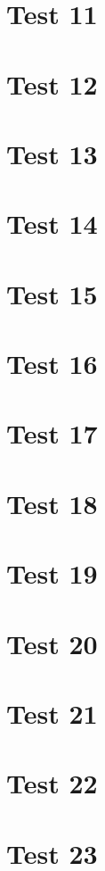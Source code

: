 \documentclass[a4paper]{article}
\begin{document}
\section{Test 11}
\label{sec:test-11}
\section{Test 12}
\label{sec:test-12}
\section{Test 13}
\label{sec:test-13}
\section{Test 14}
\label{sec:test-14}
\section{Test 15}
\label{sec:test-15}
\section{Test 16}
\label{sec:test-16}
\section{Test 17}
\label{sec:test-17}
\section{Test 18}
\label{sec:test-18}
\section{Test 19}
\label{sec:test-19}
\section{Test 20}
\label{sec:test-20}
\section{Test 21}
\label{sec:test-21}
\section{Test 22}
\label{sec:test-22}
\section{Test 23}
\label{sec:test-23}
\end{document}
